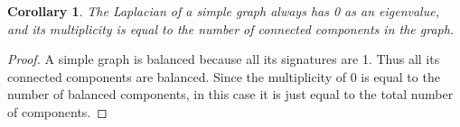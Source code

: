 \documentclass[12pt]{article}
\newtheorem{corollary}[thm]{Corollary}
\theoremstyle{definition}
\begin{document}
\begin{corollary}
The Laplacian of a simple graph always has 0 as an eigenvalue, and its multiplicity is equal to the number of connected components in the graph.
\end{corollary}
\begin{proof}
A simple graph is balanced because all its signatures are 1. Thus all its connected components are balanced. Since the multiplicity of 0 is equal to the number of balanced components, in this case it is just equal to the total number of components.
\end{proof}
\end{document}
